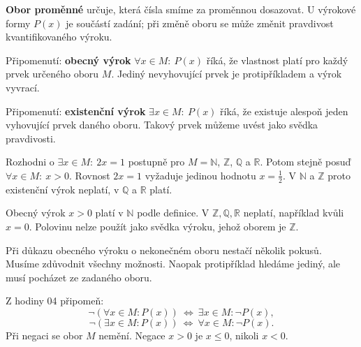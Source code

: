 \documentclass[11pt,a4paper]{article}
\begin{document}

\begin{definiceBox}[title={Definice - Obor proměnné}]
\textbf{Obor proměnné} určuje, která čísla smíme za proměnnou dosazovat.
U výrokové formy $P(x)$ je součástí zadání; při změně oboru se může
změnit pravdivost kvantifikovaného výroku.
\end{definiceBox}

\begin{definiceBox}[title={Definice - Obecný kvantifikátor}]
Připomenutí: \textbf{obecný výrok} $\forall x\in M:\ P(x)$ říká,
že vlastnost platí pro každý prvek určeného oboru $M$.
Jediný nevyhovující prvek je protipříkladem a výrok vyvrací.
\end{definiceBox}

\begin{definiceBox}[title={Definice - Existenční kvantifikátor}]
Připomenutí: \textbf{existenční výrok} $\exists x\in M:\ P(x)$ říká,
že existuje alespoň jeden vyhovující prvek daného oboru.
Takový prvek můžeme uvést jako svědka pravdivosti.
\end{definiceBox}

\begin{prikladReseniBox}[title={Příklad 1},breakable=false]
Rozhodni o $\exists x\in M:\ 2x=1$ postupně pro
$M=\mathbb N$, $\mathbb Z$, $\mathbb Q$ a $\mathbb R$.
Potom stejně posuď $\forall x\in M:\ x>0$.
\tcblower
Rovnost $2x=1$ vyžaduje jedinou hodnotu $x=\frac12$.
V $\mathbb N$ a $\mathbb Z$ proto existenční výrok neplatí,
v $\mathbb Q$ a $\mathbb R$ platí.

Obecný výrok $x>0$ platí v $\mathbb N$ podle definice.
V $\mathbb Z,\mathbb Q,\mathbb R$ neplatí, například kvůli $x=0$.
Polovinu nelze použít jako svědka výroku, jehož oborem je $\mathbb Z$.
\end{prikladReseniBox}

Při důkazu obecného výroku o nekonečném oboru nestačí několik pokusů.
Musíme zdůvodnit všechny možnosti. Naopak protipříklad hledáme jediný,
ale musí pocházet ze zadaného oboru.

Z hodiny 04 připomeň:
\[
\neg(\forall x\in M:P(x))\ \Leftrightarrow\ \exists x\in M:\neg P(x),
\]
\[
\neg(\exists x\in M:P(x))\ \Leftrightarrow\ \forall x\in M:\neg P(x).
\]
Při negaci se obor $M$ nemění. Negace $x>0$ je $x\le0$, nikoli $x<0$.
\end{document}
